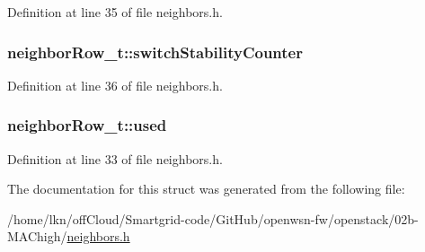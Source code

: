 Definition at line 35 of file neighbors.\+h.

\subsubsection[{\texorpdfstring{switch\+Stability\+Counter}{switchStabilityCounter}}]{ neighbor\+Row\+\_\+t\+::switch\+Stability\+Counter}\hypertarget{structneighbor_row__t_aaba53adc47888065ae6875f27b9b3f48}{}\label{structneighbor_row__t_aaba53adc47888065ae6875f27b9b3f48}


Definition at line 36 of file neighbors.\+h.

\subsubsection[{\texorpdfstring{used}{used}}]{ neighbor\+Row\+\_\+t\+::used}\hypertarget{structneighbor_row__t_a1803ce6d1b32a8f05590181c2aac294e}{}\label{structneighbor_row__t_a1803ce6d1b32a8f05590181c2aac294e}


Definition at line 33 of file neighbors.\+h.



The documentation for this struct was generated from the following file\+:\begin{DoxyCompactItemize}
\item 
/home/lkn/off\+Cloud/\+Smartgrid-\/code/\+Git\+Hub/openwsn-\/fw/openstack/02b-\/\+M\+A\+Chigh/\hyperlink{neighbors_8h}{neighbors.\+h}\end{DoxyCompactItemize}
